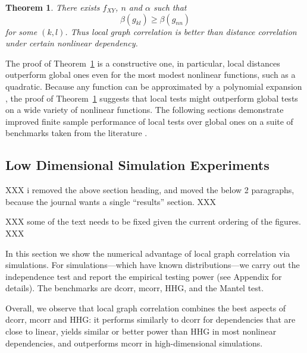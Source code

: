 \documentclass[11pt]{article}
\newtheorem{thm}{Theorem}
\begin{document}
\begin{thm}
\label{thm3}
There exists $f_{XY}$, $n$ and $\alpha$ such that 
\begin{equation}
\label{equ2}
\beta(g_{kl}) \geq \beta(g_{nn})
\end{equation}
for some $(k,l)$.
Thus local graph correlation is better than distance correlation under certain nonlinear dependency.
\end{thm}
The proof of Theorem~\ref{thm3} is a constructive one, in particular, local distances outperform global ones even for the most modest nonlinear functions, such as a quadratic.  Because any function can be approximated by a polynomial expansion \cite{XXX}, the proof of Theorem~\ref{thm3} suggests that local tests might outperform global tests on a wide variety of nonlinear functions.  The following sections demonstrate improved finite sample performance of local tests over global ones on a suite of benchmarks taken from the literature \cite{SzekelyRizzoBakirov2007, SimonTibshirani2012, GorfineHellerHeller2012, HellerGorfine2013}.




\subsection{Low Dimensional Simulation Experiments}
\label{numer1}

XXX i removed the above section heading, and moved the below 2 paragraphs, because the journal wants a single ``results'' section.  XXX

XXX some of the text needs to be fixed given the current ordering of the figures. XXX

In this section we show the numerical advantage of local graph correlation via simulations. For simulations---which have known distributions---we carry out the independence test and report the empirical testing power (see Appendix for details). The benchmarks are dcorr, mcorr, HHG, and the Mantel test. 

Overall, we observe that local graph correlation combines the best aspects of dcorr, mcorr and HHG: it performs similarly to dcorr for dependencies that are close to linear, yields similar or better power than HHG in most nonlinear dependencies, and outperforms mcorr in high-dimensional simulations. 
\end{document}
